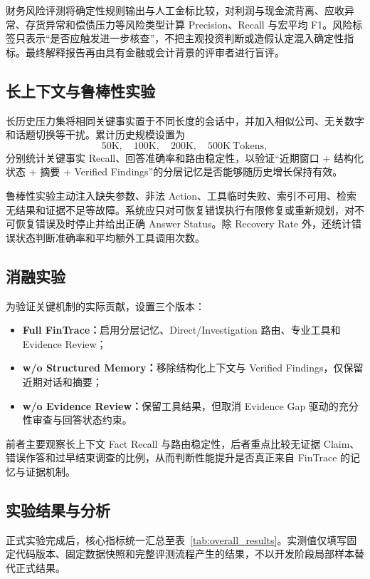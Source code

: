 财务风险评测将确定性规则输出与人工金标比较，对利润与现金流背离、应收异常、存货异常和偿债压力等风险类型计算 Precision、Recall 与宏平均 F1。风险标签只表示“是否应触发进一步核查”，不把主观投资判断或造假认定混入确定性指标。最终解释报告再由具有金融或会计背景的评审者进行盲评。

\subsection{长上下文与鲁棒性实验}

长历史压力集将相同关键事实置于不同长度的会话中，并加入相似公司、无关数字和话题切换等干扰。累计历史规模设置为
\[
50\mathrm{K},\quad 100\mathrm{K},\quad 200\mathrm{K},\quad 500\mathrm{K}\ \mathrm{Tokens},
\]
分别统计关键事实 Recall、回答准确率和路由稳定性，以验证“近期窗口 + 结构化状态 + 摘要 + Verified Findings”的分层记忆是否能够随历史增长保持有效。

鲁棒性实验主动注入缺失参数、非法 Action、工具临时失败、索引不可用、检索无结果和证据不足等故障。系统应只对可恢复错误执行有限修复或重新规划，对不可恢复错误及时停止并给出正确 Answer Status。除 Recovery Rate 外，还统计错误状态判断准确率和平均额外工具调用次数。

\subsection{消融实验}

为验证关键机制的实际贡献，设置三个版本：

\begin{itemize}
    \item \textbf{Full FinTrace：}启用分层记忆、Direct/Investigation 路由、专业工具和 Evidence Review；
    \item \textbf{w/o Structured Memory：}移除结构化上下文与 Verified Findings，仅保留近期对话和摘要；
    \item \textbf{w/o Evidence Review：}保留工具结果，但取消 Evidence Gap 驱动的充分性审查与回答状态约束。
\end{itemize}

前者主要观察长上下文 Fact Recall 与路由稳定性，后者重点比较无证据 Claim、错误作答和过早结束调查的比例，从而判断性能提升是否真正来自 FinTrace 的记忆与证据机制。

\subsection{实验结果与分析}

正式实验完成后，核心指标统一汇总至表~\ref{tab:overall_results}。实测值仅填写固定代码版本、固定数据快照和完整评测流程产生的结果，不以开发阶段局部样本替代正式结果。

